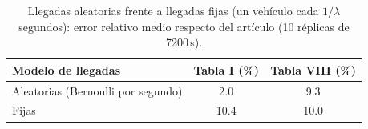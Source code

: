 \begin{table}[!t]
\caption{Llegadas aleatorias frente a llegadas fijas (un vehículo cada $1/\lambda$ segundos): error relativo medio respecto del artículo (10 réplicas de 7200\,s).}
\label{tab:llegadas}
\centering
\footnotesize
\begin{tabular}{@{}lcc@{}}
\toprule
Modelo de llegadas & Tabla I (\%) & Tabla VIII (\%) \\
\midrule
Aleatorias (Bernoulli por segundo) & 2.0 & 9.3 \\
Fijas & 10.4 & 10.0 \\
\bottomrule
\end{tabular}
\end{table}
